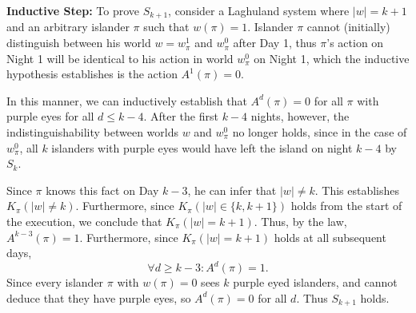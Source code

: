 \documentclass[12pt]{article}
\begin{document}
\begin{solution}
    \textbf{Inductive Step:} To prove $S_{k+1}$, consider a Laghuland system where $|w| = k + 1$ and an arbitrary islander $\pi$ such that $w(\pi) = 1$. Islander $\pi$ cannot (initially) distinguish between his world $w = w_\pi^1$ and $w_\pi^0$ after Day 1, thus $\pi$'s action on Night 1 will be identical to his action in world $w_\pi^0$ on Night 1, which the inductive hypothesis establishes is the action $A^1(\pi)=0$.

    In this manner, we can inductively establish that $A^d(\pi)=0$ for all $\pi$ with purple eyes for all $d \leq k - 4$. After the first $k-4$ nights, however, the indistinguishability between worlds $w$ and $w_\pi^0$ no longer holds, since in the case of $w_\pi^0$,  all $k$ islanders with purple eyes would have left the island on night $k-4$ by $S_k$.
    
    Since $\pi$ knows this fact on Day $k-3$, he can infer that $|w| \neq k$. This establishes $K_\pi(|w| \neq k)$. Furthermore, since $K_\pi(|w| \in \{k,k+1\})$ holds from the start of the execution, we conclude that $K_\pi(|w|=k+1)$. Thus, by the law, $A^{k-3}(\pi)=1$. Furthermore, since $K_\pi(|w|=k+1)$ holds at all subsequent days,
    \[
        \forall d \geq k - 3 : A^d(\pi)=1.
    \]
    Since every islander $\pi$ with $w(\pi) = 0$ sees $k$ purple eyed islanders, and cannot deduce that they have purple eyes, so $A^d (\pi) = 0$ for all $d$. 
    Thus $S_{k+1}$ holds.

\end{solution}
\end{document}
